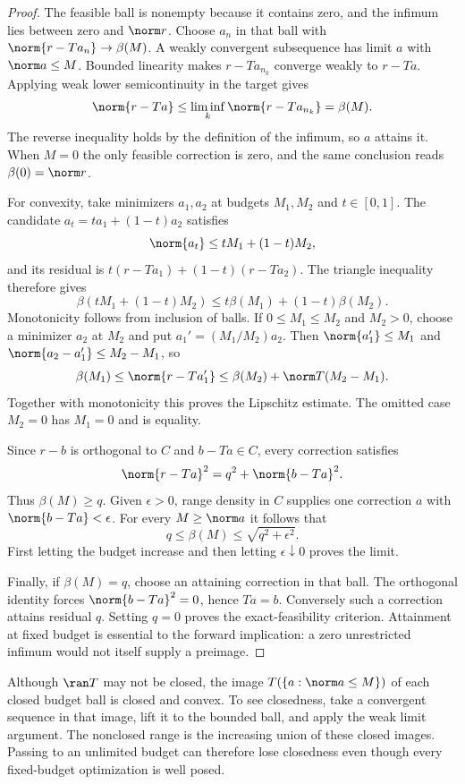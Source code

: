 \begin{proof}
The feasible ball is nonempty because it contains zero, and the infimum lies between zero and $\norm r$. Choose $a_n$ in that ball with $\norm{r-Ta_n}\to\beta(M)$. A weakly convergent subsequence has limit $a$ with $\norm a\le M$. Bounded linearity makes $r-Ta_{n_k}$ converge weakly to $r-Ta$. Applying weak lower semicontinuity in the target gives
\[
 \norm{r-Ta}\le\liminf_k\norm{r-Ta_{n_k}}=\beta(M).
\]
The reverse inequality holds by the definition of the infimum, so $a$ attains it. When $M=0$ the only feasible correction is zero, and the same conclusion reads $\beta(0)=\norm r$.

For convexity, take minimizers $a_1,a_2$ at budgets $M_1,M_2$ and $t\in[0,1]$. The candidate $a_t=ta_1+(1-t)a_2$ satisfies
\[
 \norm{a_t}\le tM_1+(1-t)M_2,
\]
and its residual is $t(r-Ta_1)+(1-t)(r-Ta_2)$. The triangle inequality therefore gives
\[
 \beta(tM_1+(1-t)M_2)\le t\beta(M_1)+(1-t)\beta(M_2).
\]
Monotonicity follows from inclusion of balls. If $0\le M_1\le M_2$ and $M_2>0$, choose a minimizer $a_2$ at $M_2$ and put $a_1'=(M_1/M_2)a_2$. Then $\norm{a_1'}\le M_1$ and $\norm{a_2-a_1'}\le M_2-M_1$, so
\[
 \beta(M_1)\le\norm{r-Ta_1'}
 \le\beta(M_2)+\norm T(M_2-M_1).
\]
Together with monotonicity this proves the Lipschitz estimate. The omitted case $M_2=0$ has $M_1=0$ and is equality.

Since $r-b$ is orthogonal to $C$ and $b-Ta\in C$, every correction satisfies
\begin{equation}\label{eq:range-decomposition}
 \norm{r-Ta}^2=q^2+\norm{b-Ta}^2.
\end{equation}
Thus $\beta(M)\ge q$. Given $\epsilon>0$, range density in $C$ supplies one correction $a$ with $\norm{b-Ta}<\epsilon$. For every $M\ge\norm a$ it follows that
\[
 q\le\beta(M)\le\sqrt{q^2+\epsilon^2}.
\]
First letting the budget increase and then letting $\epsilon\downarrow0$ proves the limit.

Finally, if $\beta(M)=q$, choose an attaining correction in that ball. The orthogonal identity forces $\norm{b-Ta}^2=0$, hence $Ta=b$. Conversely such a correction attains residual $q$. Setting $q=0$ proves the exact-feasibility criterion. Attainment at fixed budget is essential to the forward implication: a zero unrestricted infimum would not itself supply a preimage.
\end{proof}

Although $\ran T$ may not be closed, the image $T(\{a:\norm a\le M\})$ of each closed budget ball is closed and convex. To see closedness, take a convergent sequence in that image, lift it to the bounded ball, and apply the weak limit argument. The nonclosed range is the increasing union of these closed images. Passing to an unlimited budget can therefore lose closedness even though every fixed-budget optimization is well posed.


